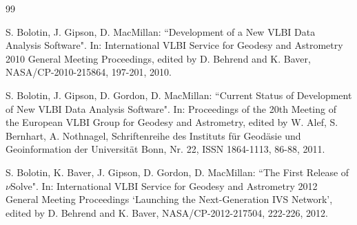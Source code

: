 \documentclass [10pt,letterpaper]{report}
\begin{document}
%
%
\begin{thebibliography}{99}

S. Bolotin, J. Gipson, D. MacMillan: ``Development of a New VLBI Data
Analysis Software". In: International VLBI Service for Geodesy and
Astrometry 2010 General Meeting Proceedings, edited by D. Behrend and K.
Baver, NASA/CP-2010-215864, 197-201, 2010.


S. Bolotin, J. Gipson, D. Gordon, D. MacMillan: ``Current Status of
Development of New VLBI Data Analysis Software". In: Proceedings of the
20th Meeting of the European VLBI Group for Geodesy and Astrometry,
edited by W. Alef, S. Bernhart, A. Nothnagel, Schriftenreihe des
Instituts f\"ur Geod\"asie und Geoinformation der Universit\"at Bonn,
Nr. 22, ISSN 1864-1113, 86-88, 2011.


S. Bolotin, K. Baver, J. Gipson, D. Gordon, D. MacMillan: ``The First
Release of $\nu$Solve". In: International VLBI Service for Geodesy and
Astrometry 2012 General Meeting Proceedings `Launching the
Next-Generation IVS Network', edited by D. Behrend and K. Baver,
NASA/CP-2012-217504, 222-226, 2012.


\end{thebibliography}
\end{document}
